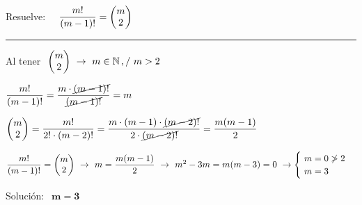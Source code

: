 \begin{miejercicio}

Resuelve: $\quad \dfrac{m!}{(m-1)!}=\mqty(m\\2)$
\vspace{2mm} 

\rule{300pt}{0.1pt}	

\vspace{2mm} Al tener $\ \mqty(m\\2) \ \to \ m\in \mathbb N\, , /\ m>2$

\vspace{2mm} $\dfrac{m!}{(m-1)!}= \dfrac{m\cdot \cancel{(m-1)!}}{\cancel{(m-1)!}}=m $

$\mqty(m\\2)=\dfrac{m!}{2!\cdot (m-2)!}=\dfrac{m\cdot (m-1) \cdot \cancel{(m-2)!}}{2\cdot \cancel{(m-2)!}}=\dfrac{m(m-1)}{2} $

\vspace{2mm} $\dfrac{m!}{(m-1)!}=\mqty(m\\2) \ \to \ m=\dfrac{m(m-1)}{2} \ \to \ m^2-3m=m(m-3)=0 \ \to \begin{cases} \ m=0 \not> 2 \\ \ m=3\end{cases}$

\vspace{2mm} Solución: $\ \ \boldsymbol{m=3}$

\end{miejercicio}



